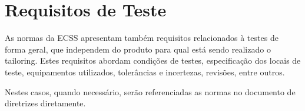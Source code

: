 \section{Requisitos de Teste}


As normas da \gls{ECSS} apresentam também requisitos relacionados à testes de forma geral, que independem do produto para qual está sendo realizado o tailoring.
Estes requisitos abordam condições de testes, especificação dos locais de teste, equipamentos utilizados, tolerâncias e incertezas, revisões, entre outros.

Nestes casos, quando necessário, serão referenciadas as normas no documento de diretrizes diretamente.

